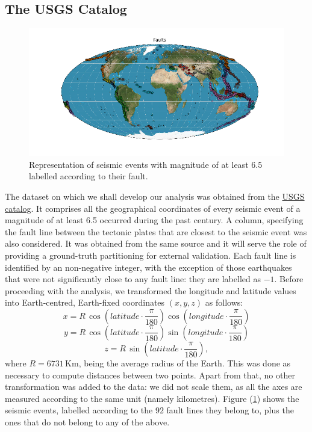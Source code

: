 \documentclass[a4paper]{article}
\begin{document}
	\subsection{The USGS Catalog}
	\begin{figure}[H]
	\includegraphics[width=\linewidth]{Faults.png}
	\caption{Representation of seismic events with magnitude of at least 6.5 labelled according to their fault.}
	\label{fig:fault}
	\end{figure}
	The dataset on which we shall develop our analysis was obtained from the \href{https://earthquake.usgs.gov/earthquakes/search/}{USGS catalog}. It comprises all the geographical coordinates of every seismic event of a magnitude of at least 6.5 occurred during the past century. A column, specifying the fault line between the tectonic plates that are closest to the seismic event was also considered. It was obtained from the same source and it will serve the role of providing a ground-truth partitioning for external validation. Each fault line is identified by an non-negative integer, with the exception of those earthquakes that were not significantly close to any fault line: they are labelled as $-1$.
	Before proceeding with the analysis, we transformed the longitude and latitude values into Earth-centred, Earth-fixed coordinates $\left(x,y,z\right)$ as follows:
	\begin{equation*}
	x = R \, \cos\left(latitude \cdot \frac{\pi}{180}\right) \cos\left(longitude \cdot \frac{\pi}{180} \right)
	\end{equation*}
	\begin{equation*}
	y = R \, \cos\left(latitude \cdot \frac{\pi}{180}\right) \sin\left(longitude \cdot \frac{\pi}{180} \right)
	\end{equation*}
	\begin{equation*}
	z = R \, \sin\left(latitude \cdot \frac{\pi}{180}\right),
	\end{equation*}
	where $R = 6731 \, \mathrm{Km}$, being the average radius of the Earth. This was done as necessary to compute distances between two points.
	Apart from that, no other transformation was added to the data: we did not scale them, as all the axes are measured according to the same unit (namely kilometres).
	Figure (\ref{fig:fault}) shows the seismic events, labelled according to the $92$ fault lines they belong to, plus the ones that do not belong to any of the above.
\end{document}
